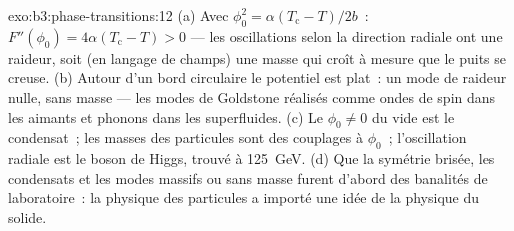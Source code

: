 \begin{solution}{exo:b3:phase-transitions:12}
(a) Avec $\phi_0^2 = \alpha(T_{\text{c}} - T)/2b$~: $F''(\phi_0) =
4\alpha(T_{\text{c}} - T) > 0$ --- les oscillations selon la
direction radiale ont une raideur, soit (en langage de champs) une
masse qui croît à mesure que le puits se creuse. (b) Autour d'un
bord circulaire le potentiel est plat~: un mode de raideur nulle,
sans masse --- les modes de Goldstone réalisés comme ondes de spin
dans les aimants et phonons dans les superfluides. (c) Le
$\phi_0 \neq 0$ du vide est le condensat~; les masses des
particules sont des couplages à $\phi_0$~; l'oscillation radiale
est le boson de Higgs, trouvé à \qty{125}{GeV}. (d) Que la symétrie
brisée, les condensats et les modes massifs ou sans masse furent
d'abord des banalités de laboratoire~: la physique des particules a
importé une idée de la physique du solide.
\end{solution}

